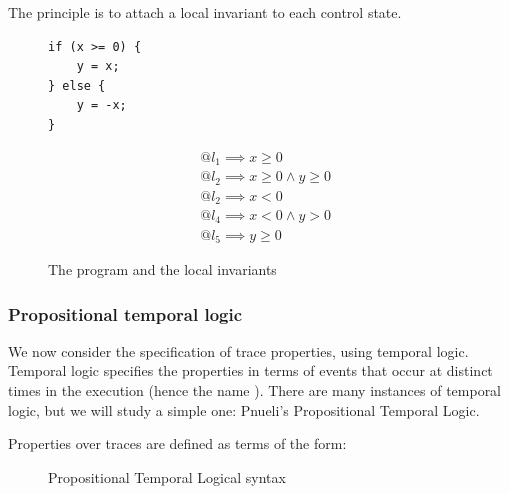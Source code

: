 \documentclass[toc]{../cs-classes/cs-classes}
\begin{document}
\begin{example}
    The principle is to attach a local invariant to each control state.

    \begin{figure}[!ht]
        \centering
        \begin{minipage}{0.2\textwidth}
            \centering
            \begin{verbatim}
if (x >= 0) {
    y = x;
} else {
    y = -x;
}
            \end{verbatim}
        \end{minipage}
        \begin{minipage}{.5\textwidth}
          \begin{equation*}
            \begin{aligned}
                &@l_1 \implies x\geq 0\\
                &@l_2 \implies x\geq 0 \land y\geq 0\\
                &@l_2 \implies x<0\\
                &@l_4 \implies x<0 \land y>0\\
                &@l_5 \implies y\geq 0
            \end{aligned}
          \end{equation*}
        \end{minipage}
        \caption{The program and the local invariants}
    \end{figure}
\end{example}

\subsubsection{Propositional temporal logic}
We now consider the specification of trace properties, using temporal logic. Temporal logic specifies the properties in terms of events that occur at distinct times in the execution (hence the name ). There are many instances of temporal logic, but we will study a simple one: Pnueli's Propositional Temporal Logic. 

\begin{definition}
    Properties over traces are defined as terms of the form:
    \begin{figure}[H]
        \centering
        \begin{mgrammar}
        \end{mgrammar}
        \caption{Propositional Temporal Logical syntax}
    \end{figure}
\end{definition}
\end{document}
